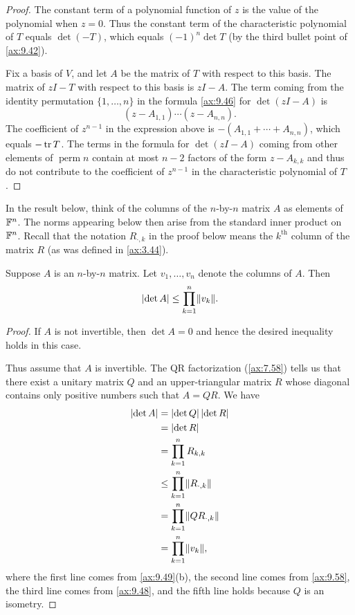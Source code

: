 \begin{proof}
The constant term of a polynomial function of $z$ is the value of the
polynomial when $z=0$. Thus the constant term of the characteristic polynomial
of $T$ equals $\det(-T)$, which equals $(-1)^n\det T$ (by the third bullet
point of \ref{ax:9.42}).

Fix a basis of $V$, and let $A$ be the matrix of $T$ with respect to this
basis. The matrix of $zI-T$ with respect to this basis is $zI-A$. The term
coming from the identity permutation $\{1,\dots,n\}$ in the formula
\ref{ax:9.46} for $\det(zI-A)$ is
\[ (z-A_{1,1})\cdots(z-A_{n,n}). \]
The coefficient of $z^{n-1}$ in the expression above is
$-(A_{1,1}+\cdots+A_{n,n})$, which equals $-\operatorname{tr} T$. The terms in the formula
for $\det(zI-A)$ coming from other elements of $\operatorname{perm} n$ contain
at most $n-2$ factors of the form $z-A_{k,k}$ and thus do not contribute to the
coefficient of $z^{n-1}$ in the characteristic polynomial of $T$.
\end{proof}

%
In the result below, think of the columns of the $n$-by-$n$ matrix $A$ as
elements of $\mathbb{F}^n$. The norms appearing below then arise from the standard
inner product on $\mathbb{F}^n$. Recall that the notation $R_{\cdot,k}$ in the proof
below means the $k^{\text{th}}$ column of the matrix $R$ (as was defined in
\ref{ax:3.44}).

\begin{result}\label{ax:9.66}
Suppose $A$ is an $n$-by-$n$ matrix. Let $v_1,\dots,v_n$ denote the columns of
$A$. Then
\[ \lvert \operatorname{det} A \rvert \le \prod_{k=1}^n\lVert v_k \rVert. \]
\end{result}

\begin{proof}
If $A$ is not invertible, then $\det A=0$ and hence the desired inequality
holds in this case.

Thus assume that $A$ is invertible. The QR factorization (\ref{ax:7.58}) tells
us that there exist a unitary matrix $Q$ and an upper-triangular matrix $R$
whose diagonal contains only positive numbers such that $A=QR$. We have
\begin{align*}
\lvert \operatorname{det} A \rvert &= \lvert \operatorname{det} Q \rvert\,\lvert \operatorname{det} R \rvert\\
  &= \lvert \operatorname{det} R \rvert\\
  &= \prod_{k=1}^n R_{k,k}\\
  &\le \prod_{k=1}^n\lVert R_{\cdot,k} \rVert\\
  &= \prod_{k=1}^n\lVert QR_{\cdot,k} \rVert\\
  &= \prod_{k=1}^n\lVert v_k \rVert,
\end{align*}
where the first line comes from \ref{ax:9.49}(b), the second line comes from
\ref{ax:9.58}, the third line comes from \ref{ax:9.48}, and the fifth line
holds because $Q$ is an isometry.
\end{proof}

